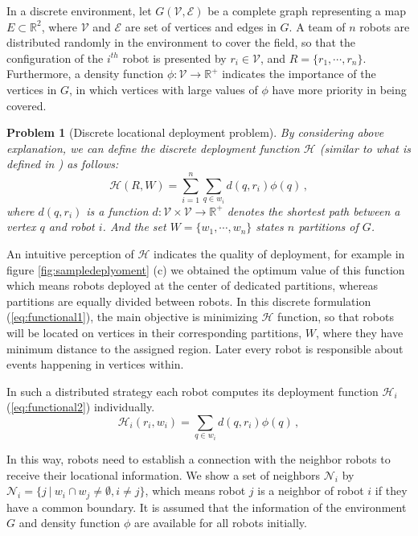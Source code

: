 \documentclass[twocolumn]{svjour3}       %
\newtheorem{myprob}{Problem}
\begin{document}
In a discrete environment, let $G(\mathcal V,\mathcal E)$ be a complete graph representing a map  $E \subset \mathbb{R}^2$, where $\mathcal V$ and $\mathcal E$ are set of vertices and edges in $G$. 
%
A team of $n$ robots are distributed randomly in the environment to cover the field, so that the configuration of the $i^{th}$ robot is presented by $r_i \in \mathcal V$, and $R=\{r_1,\cdots,r_n \}$. Furthermore, a density function $\phi: \mathcal{V} \rightarrow \mathbb{R}^+$ indicates the importance of the vertices in $G$, in which vertices with large values of $\phi$ have more priority in being covered. 
%
\begin{myprob}[Discrete locational deployment problem]
\label{Prob:deployment}
\qquad \qquad \qquad
%
\textnormal{
By considering above explanation, we can define the discrete deployment function $\mathcal{H}$ (similar to what is defined in \cite{Yun2013}) as follows:}
%
\begin{equation}\label{eq:functional1}
\mathcal{H}(R,W) =
\sum_{i = 1}^{n} \sum_{q \in w_i}
d(q, r_i)\phi(q) \,,
\end{equation}
%
\textnormal{
where $d(q,r_i)$ is a function $d:\mathcal V \times \mathcal V \rightarrow \mathbb R^+$ denotes the shortest path between a vertex $q$ and robot $i$. And the set $W=\{w_1,\cdots,w_n\}$ states $n$ partitions of $G$.}
\end{myprob}

An intuitive perception of $\mathcal{H}$ indicates the quality of deployment, for example in figure \ref{fig:sampledeplyoment} (c) we obtained the optimum value of this function which means robots deployed at the center of dedicated partitions, whereas partitions are equally divided between robots.
%
In this discrete formulation (\ref{eq:functional1}), the main objective is minimizing $\mathcal{H}$ function, so that robots will be located on vertices in their corresponding partitions, $W$, where they have minimum distance to the assigned region. Later every robot is responsible about events happening in vertices within.

In such a distributed strategy each robot computes its deployment function $\mathcal{H}_i$ (\ref{eq:functional2}) individually. 
%
\begin{equation}
\label{eq:functional2}
\mathcal{H}_{i}(r_i,w_i) = \sum_{q \in w_i}
d(q, r_i)\phi(q) \,,
\end{equation}

In this way, robots need to establish a connection with the neighbor robots to receive their locational information. We show a set of neighbors $\mathcal{N}_i$ by $\mathcal N_i=\{j~|~w_i \cap w_j \neq \emptyset, i \neq j \}$, which means robot $j$ is a neighbor of robot $i$ if they have a common boundary. It is assumed that the information of the environment $G$ and density function $\phi$ are available for all robots initially. 
\end{document}
